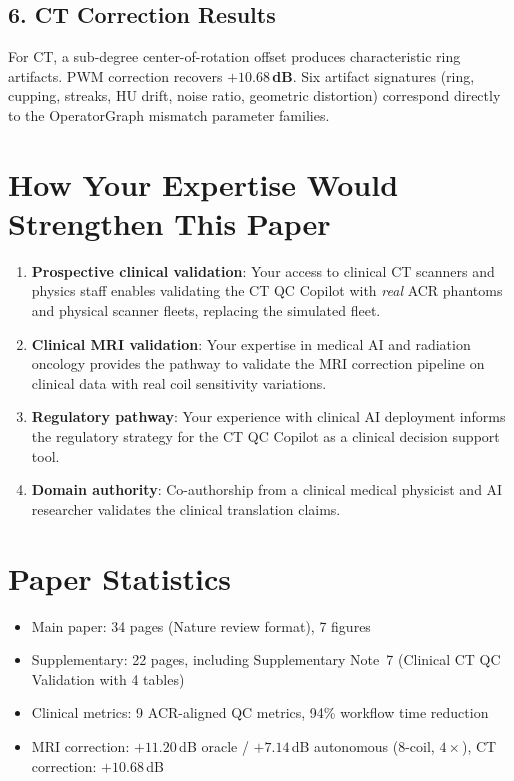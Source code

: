 \documentclass[11pt]{article}
\begin{document}
\subsection*{6. CT Correction Results}

For CT, a sub-degree center-of-rotation offset produces characteristic ring artifacts.  PWM correction recovers \textbf{$+10.68$\,dB}.  Six artifact signatures (ring, cupping, streaks, HU drift, noise ratio, geometric distortion) correspond directly to the OperatorGraph mismatch parameter families.

\section*{How Your Expertise Would Strengthen This Paper}

\begin{enumerate}
  \item \textbf{Prospective clinical validation}: Your access to clinical CT scanners and physics staff enables validating the CT QC Copilot with \emph{real} ACR phantoms and physical scanner fleets, replacing the simulated fleet.
  \item \textbf{Clinical MRI validation}: Your expertise in medical AI and radiation oncology provides the pathway to validate the MRI correction pipeline on clinical data with real coil sensitivity variations.
  \item \textbf{Regulatory pathway}: Your experience with clinical AI deployment informs the regulatory strategy for the CT QC Copilot as a clinical decision support tool.
  \item \textbf{Domain authority}: Co-authorship from a clinical medical physicist and AI researcher validates the clinical translation claims.
\end{enumerate}

\section*{Paper Statistics}
\begin{itemize}
  \item Main paper: 34 pages (Nature review format), 7 figures
  \item Supplementary: 22 pages, including Supplementary Note~7 (Clinical CT QC Validation with 4 tables)
  \item Clinical metrics: 9 ACR-aligned QC metrics, 94\% workflow time reduction
  \item MRI correction: $+11.20$\,dB oracle / $+7.14$\,dB autonomous (8-coil, $4\times$), CT correction: $+10.68$\,dB
\end{itemize}
\end{document}
